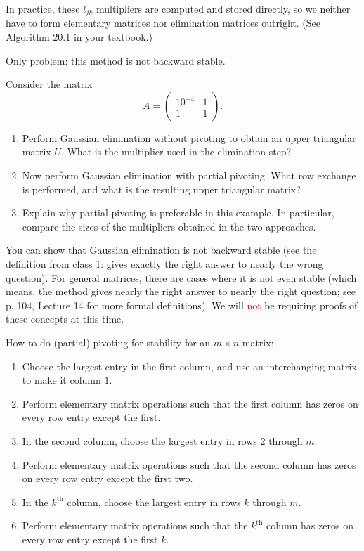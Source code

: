 \documentclass{ximera}
\begin{document}
In practice, these $l_{jk}$ multipliers are computed and stored directly, so we neither have to form elementary matrices nor elimination matrices outright.  (See Algorithm 20.1 in your textbook.)

Only problem: this method is not backward stable.


\begin{exercise}
Consider the matrix
\[
A = \begin{pmatrix}
10^{-4} & 1\\
1 & 1
\end{pmatrix}.
\]

\begin{enumerate}
    \item Perform Gaussian elimination without pivoting to obtain an upper triangular matrix $U$. What is the multiplier used in the elimination step?

    \item Now perform Gaussian elimination with partial pivoting. What row exchange is performed, and what is the resulting upper triangular matrix?

    \item Explain why partial pivoting is preferable in this example. In particular, compare the sizes of the multipliers obtained in the two approaches.
\end{enumerate}
\end{exercise}

You can show that Gaussian elimination is not backward stable (see the definition from class 1: gives exactly the right answer to nearly the wrong question).  For general matrices, there are cases where it is not even stable (which means, the method gives nearly the right answer to nearly the right question; see p. 104, Lecture 14 for more formal definitions).  We will \textcolor{red}{not} be requiring proofs of these concepts at this time.

How to do (partial) pivoting for stability for an $m \times n$ matrix:
\begin{enumerate}
    \item Choose the largest entry in the first column, and use an interchanging matrix to make it column $1$.
    \item Perform elementary matrix operations such that the first column has zeros on every row entry except the first.
    \item In the second column, choose the largest entry in rows 2 through $m$.
    \item Perform elementary matrix operations such that the second column has zeros on every row entry except the first two.
    \item In the $k^{\text{th}}$ column, choose the largest entry in rows $k$ through $m$.
    \item Perform elementary matrix operations such that the $k^{\text{th}}$ column has zeros on every row entry except the first $k$.
\end{enumerate}
\end{document}
